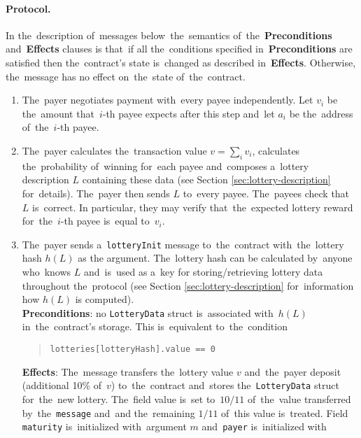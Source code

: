 \documentclass[a4paper]{article}
\newcommand{\lotteryhash}[1]{h({#1})}
\begin{document}
\paragraph{Protocol.}
    In the~description of~messages below~the~semantics of~the~\textbf{Preconditions} and~\textbf{Effects} clauses is
    that~if all the~conditions specified in~\textbf{Preconditions} are satisfied then the~contract's state is~changed
    as described in~\textbf{Effects}. Otherwise, the~message has no effect on~the~state of~the~contract.
    \begin{enumerate}
        \item The~payer negotiates payment with~every payee independently. Let $v_i$ be the~amount that~$i$-th payee
            expects after this step and~let $a_i$ be the~address of~the~$i$-th payee.
        \item The~payer calculates the~transaction value $v = \sum_i v_i$, calculates the~probability of~winning
            for~each payee and~composes a~lottery description $L$ containing these data (see Section
            \ref{sec:lottery-description} for~details). The~payer then sends $L$ to~every payee. The~payees check that~$L$
            is~correct. In particular, they may verify that~the~expected lottery reward for~the~$i$-th payee is~equal
            to~$v_i$.
        \item The~payer sends a~\texttt{lotteryInit} message to~the~contract with~the~lottery hash $\lotteryhash{L}$ as the
          argument. The~lottery hash can be calculated by~anyone who~knows $L$ and~is~used as a~key for
          storing/retrieving lottery data throughout the~protocol (see Section \ref{sec:lottery-description} for~information
          how $\lotteryhash{L}$ is computed).\\
            \textbf{Preconditions}: no \texttt{LotteryData} struct is~associated with~$\lotteryhash{L}$ in~the~contract's
            storage. This is~equivalent to~the~condition
            \begin{quote}
	      \verb!lotteries[lotteryHash].value == 0!
            \end{quote}
            \textbf{Effects}: The~message transfers the~lottery value $v$ and~the~payer deposit (additional 10\%
            of~$v$) to~the~contract and~stores the~\texttt{LotteryData} struct for~the~new lottery. The~field value
            is~set to~$10/11$ of~the~value transferred by~the~\texttt{message} and~and the~remaining $1/11$ of~this value
            is~treated. Field \texttt{maturity} is~initialized with~argument $m$ and~\texttt{payer} is~initialized with

\end{enumerate}
\end{document}
